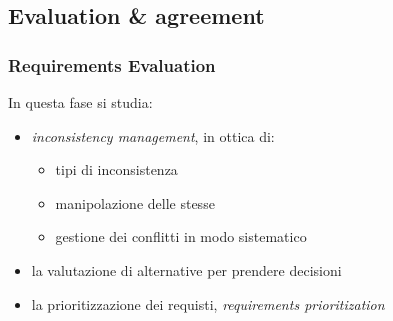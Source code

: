 \documentclass[a4paper,12pt, oneside]{book}
\begin{document}
\subsection{Evaluation \& agreement}
\subsubsection{Requirements Evaluation}
In questa fase si studia:
\begin{itemize}
  \item \textit{inconsistency management}, in ottica di:
  \begin{itemize}
    \item tipi di inconsistenza
    \item manipolazione delle stesse 
    \item gestione dei conflitti in modo sistematico
  \end{itemize}
  \item la valutazione di alternative per prendere decisioni
  \item la prioritizzazione dei requisti, \textit{requirements prioritization}
\end{itemize}
\end{document}
